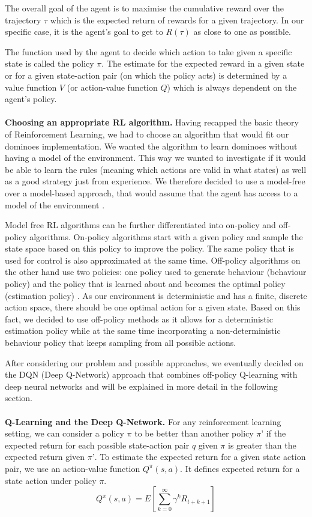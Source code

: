 \documentclass[12pt,a4paper]{article}
\begin{document}
{The overall goal of the agent is to maximise the cumulative reward over the trajectory $\tau$ which is the expected return of rewards for a given trajectory. In our specific case, it is the agent’s goal to get to $R(\tau)$ as close to one as possible. 

The function used by the agent to decide which action to take given a specific state is called the policy $\pi$. The estimate for the expected reward in a given state or for a given state-action pair (on which the policy acts) is determined by a value function $V$ (or action-value function $Q$) which is always dependent on the agent's policy.
\\ 
\\
\noindent \textbf{Choosing an appropriate RL algorithm.} Having recapped the basic theory of Reinforcement Learning, we had to choose an algorithm that would fit our dominoes implementation. We wanted the algorithm to learn dominoes without having a model of the environment. This way we wanted to investigate if it would be able to learn the rules (meaning which actions are valid in what states) as well as a good strategy just from experience. We therefore decided to use a model-free over a model-based approach, that would assume that the agent has access to a model of the environment \citep{russell_artificial_2010}.

Model free RL algorithms can be further differentiated into on-policy and off-policy algorithms. On-policy algorithms start with a given policy and sample the state space based on this policy to improve the policy. The same policy that is used for control is also approximated at the same time. Off-policy algorithms on the other hand use two policies: one policy used to generate behaviour (behaviour policy) and the policy that is learned about and becomes the optimal policy (estimation policy) \citep{sutton_reinforcement_2018}. As our environment is deterministic and has a finite, discrete action space, there should be one optimal action for a given state. Based on this fact, we decided to use off-policy methods as it allows for a deterministic estimation policy while at the same time incorporating a non-deterministic behaviour policy that keeps sampling from all possible actions.

After considering our problem and possible approaches, we eventually decided on the DQN (Deep Q-Network) approach that combines off-policy Q-learning with deep neural networks and will be explained in more detail in the following section.
\\ 
\\
\noindent \textbf{Q-Learning and the Deep Q-Network.}
For any reinforcement learning setting, we can consider a policy $\pi$ to be better than another policy $\pi’$ if the expected return for each possible state-action pair $q$ given $\pi$ is greater than the expected return given $\pi’$. To estimate the expected return for a given state action pair, we use an action-value function $Q^{\pi}(s,a)$. It defines expected return for a state action under policy $\pi$.
\[ 
 Q^{\pi}(s,a) = E\left[  \sum_{k=0}^{\infty}  \gamma^k R_{t+k+1} \right]
\]

}
\end{document}
